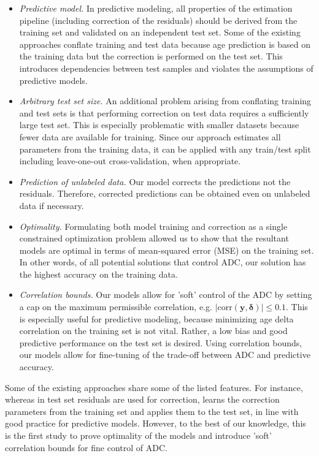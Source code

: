 \documentclass[utf8]{frontiersSCNS} %
\newcommand{\corr}{\text{corr}}
\renewcommand{\d}{\boldsymbol{\delta}}
\newcommand{\y}{\mathbf{y}}
\begin{document}
\begin{itemize}
    \item\textit{Predictive model.} In predictive modeling, all properties of the estimation pipeline (including correction of the residuals) should be derived from the training set and validated on an independent test set. Some of the existing approaches conflate training and test data because age prediction is based on the training data but the correction is performed on the test set. This introduces dependencies between test samples and violates the assumptions of predictive models.
    \item \textit{Arbitrary test set size.} An additional problem arising from conflating training and test sets is that performing correction on test data requires a sufficiently large test set. This is especially problematic with smaller datasets because fewer data are available for training. Since our approach estimates all parameters from the training data, it can be applied with any train/test split including leave-one-out cross-validation, when appropriate.
    \item \textit{Prediction of unlabeled data.} Our model corrects the predictions not the residuals. Therefore, corrected predictions can be obtained even on unlabeled data if necessary.
    \item \textit{Optimality.} Formulating both model training and correction as a single constrained optimization problem allowed us to show that the resultant models are optimal in terms of mean-squared error (MSE) on the training set. In other words, of all potential solutions that control ADC, our solution has the highest accuracy on the training data.
    \item\textit{Correlation bounds.} Our models allow for 'soft' control of the ADC by setting a cap on the maximum permissible correlation, e.g. $|\corr(\y,\d)|\le 0.1$. This is especially useful for predictive modeling, because minimizing age delta correlation on the training set is not vital. Rather, a low bias and good predictive performance on the test set is desired. Using correlation bounds, our models allow for fine-tuning of the trade-off between ADC and predictive accuracy.
\end{itemize}

Some of the existing approaches share some of the listed features. For instance, whereas in \cite{Le2018ABrainAGE} test set residuals are used for correction,  \cite{Beheshti2019Bias-adjustmentScheme} learns the correction parameters from the training set and applies them to the test set, in line with good practice for predictive models. 
However, to the best of our knowledge, this is the first study to prove optimality of the models and introduce 'soft' correlation bounds for fine control of ADC.
\end{document}
